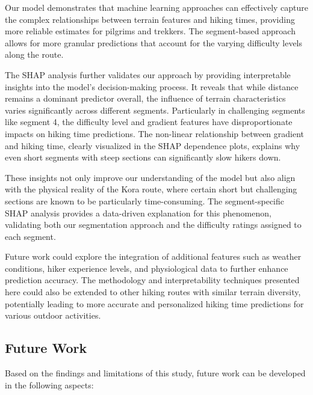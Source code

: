 \documentclass[12pt]{article}
\begin{document}
Our model demonstrates that machine learning approaches can effectively capture the complex relationships between terrain features and hiking times, providing more reliable estimates for pilgrims and trekkers. The segment-based approach allows for more granular predictions that account for the varying difficulty levels along the route.

The SHAP analysis further validates our approach by providing interpretable insights into the model's decision-making process. It reveals that while distance remains a dominant predictor overall, the influence of terrain characteristics varies significantly across different segments. Particularly in challenging segments like segment 4, the difficulty level and gradient features have disproportionate impacts on hiking time predictions. The non-linear relationship between gradient and hiking time, clearly visualized in the SHAP dependence plots, explains why even short segments with steep sections can significantly slow hikers down.

These insights not only improve our understanding of the model but also align with the physical reality of the Kora route, where certain short but challenging sections are known to be particularly time-consuming. The segment-specific SHAP analysis provides a data-driven explanation for this phenomenon, validating both our segmentation approach and the difficulty ratings assigned to each segment.

Future work could explore the integration of additional features such as weather conditions, hiker experience levels, and physiological data to further enhance prediction accuracy. The methodology and interpretability techniques presented here could also be extended to other hiking routes with similar terrain diversity, potentially leading to more accurate and personalized hiking time predictions for various outdoor activities.

\subsection{Future Work}

Based on the findings and limitations of this study, future work can be developed in the following aspects:
\end{document}
